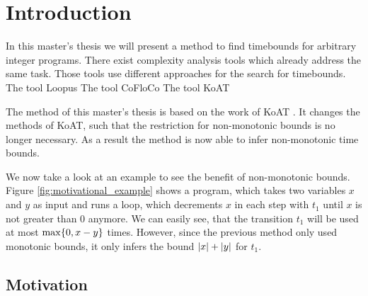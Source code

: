 \section{Introduction}

In this master's thesis we will present a method to find timebounds for arbitrary integer programs.
There exist complexity analysis tools which already address the same task.
Those tools use different approaches for the search for timebounds.
The tool Loopus \cite{loopus1} \cite{loopus2} 
The tool CoFloCo \cite{cofloco1} \cite{cofloco2} \cite{cofloco3} \cite{cofloco4} 
The tool KoAT \cite{koat} 

The method of this master's thesis is based on the work of KoAT \cite{koat}.
It changes the methods of KoAT, such that the restriction for non-monotonic bounds is no longer necessary.
As a result the method is now able to infer non-monotonic time bounds.

We now take a look at an example to see the benefit of non-monotonic bounds.
Figure \ref{fig:motivational_example} shows a program, which takes two variables $x$ and $y$ as input and runs a loop, which decrements $x$ in each step with $t_1$ until $x$ is not greater than 0 anymore.
We can easily see, that the transition $t_1$ will be used at most $\max \lbrace 0, x-y \rbrace$ times.
However, since the previous method only used monotonic bounds, it only infers the bound $\left|x\right|+\left|y\right|$ for $t_1$.


\subsection{Motivation}




